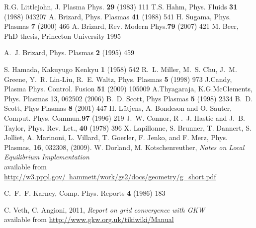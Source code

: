 \begin{thebibliography}{10}
 R.G. Littlejohn, J. Plasma Phys. {\bf 29} (1983) 111
 T.S. Hahm, Phys. Fluids {\bf 31} (1988) 043207 
 A. Brizard, Phys. Plasmas {\bf 41} (1988) 541 
 H. Sugama, Phys. Plasmas {\bf 7} (2000) 466
 A. Brizard, Rev. Modern Phys.{\bf 79} (2007) 421 
 M. Beer, PhD thesis, Princeton University 1995 

 A.~J. Brizard, Phys. Plasmas {\bf 2} (1995) 459 

 S. Hamada, Kakuyugo Kenkyu {\bf 1} (1958) 542
 R.~L. Miller, M.~S. Chu, J.~M. Greene, Y.~R. Lin-Liu, R.~E. Waltz, Phys. Plasmas {\bf 5} (1998) 973
 J.Candy, Plasma Phys. Control. Fusion {\bf 51} (2009) 105009
 A.Thyagaraja, K.G.McClements, Phys. Plasmas 13, 062502 (2006)
 B.~D. Scott, Phys Plasmas {\bf 5} (1998) 2334 
 B.~D. Scott, Phys Plasmas {\bf 8} (2001) 447 
 H. L\"utjens, A. Bondeson and O. Sauter, Comput. Phys. Commun.{\bf 97} (1996) 219 
 J.~W. Connor,  R .~J. Hastie and J.~B. Taylor, Phys. Rev. Let., {\bf 40} (1978) 396 
  X. Lapillonne, S. Brunner, T. Dannert, S. Jolliet, A. Marinoni, L. Villard, T. Goerler, F. Jenko, and F. Merz,  Phys. Plasmas, {\bf 16}, 032308, (2009). 
 W. Dorland, M. Kotschenreuther, \textit{Notes on Local
Equilibrium Implementation}\\
available from \href{http://w3.pppl.gov/~hammett/work/gs2/docs/geometry/g_short.pdf}{http://w3.pppl.gov/~hammett/work/gs2/docs/geometry/g_short.pdf}

 C.~F.~F. Karney, Comp. Phys. Reports {\bf 4} (1986) 183  

 C. Veth, C. Angioni, 2011, \textit{Report on grid convergence with GKW}\\
available from \href{http://www.gkw.org.uk/tikiwiki/Manual}{http://www.gkw.org.uk/tikiwiki/Manual}


\end{thebibliography}

